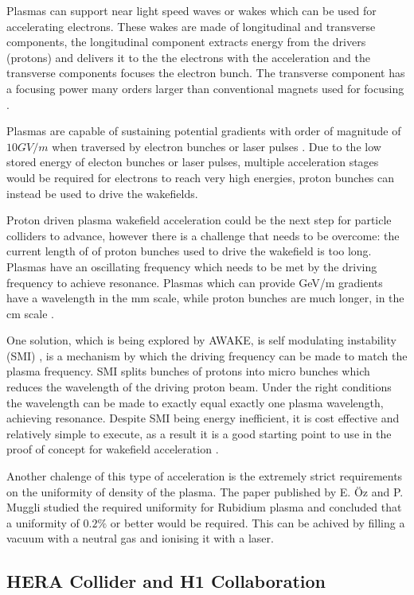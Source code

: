 \documentclass[journal, a4paper,10pt]{IEEEtran}
\begin{document}
Plasmas can support near light speed waves or wakes which can be used for accelerating electrons. These wakes are made of longitudinal and transverse components, the longitudinal component extracts energy from the drivers (protons) and delivers it to the the electrons with the acceleration and the transverse components focuses the electron bunch. The transverse component has a focusing power many orders larger than conventional magnets used for focusing \cite{0114}.

Plasmas are capable of sustaining potential gradients with order of magnitude of $10 GV/m$ when traversed by electron bunches \cite{Bl2007} or laser pulses \cite{Mangles2004}. Due to the low stored energy of electon bunches or laser pulses, multiple acceleration stages would be required for electrons to reach very high energies, proton bunches can instead be used to drive the wakefields.   

Proton driven plasma wakefield acceleration could be the next step for particle colliders to advance, however there is a challenge that needs to be overcome: the current length of of proton bunches used to drive the wakefield is too long. Plasmas have an oscillating frequency which needs to be met by the driving frequency to achieve resonance. Plasmas which can provide GeV/m gradients have a wavelength in the mm scale, while proton bunches are much longer, in the cm scale \cite{0114}.

One solution, which is being explored by AWAKE, is self modulating instability (SMI) \cite{255003}, is a mechanism by which the driving frequency can be made to match the plasma frequency. SMI splits bunches of protons into micro bunches which reduces the wavelength of the driving proton beam. Under the right conditions the wavelength can be made to exactly equal exactly one plasma wavelength, achieving resonance. Despite SMI being energy inefficient, it is cost effective and relatively simple to execute, as a result it is a good starting point to use in the proof of concept for wakefield acceleration \cite{1115,0114}.

Another chalenge of this type of acceleration is the extremely strict requirements on the uniformity of density of the plasma. The paper published by E. {\"O}z and P. Muggli \cite{OZ} studied the required uniformity for Rubidium plasma and concluded that a uniformity of $0.2\%$ or better would be required. This can be achived by filling a vacuum with a neutral gas and ionising it with a laser.  

\subsection*{\textbf{HERA Collider and H1 Collaboration}}
\end{document}
